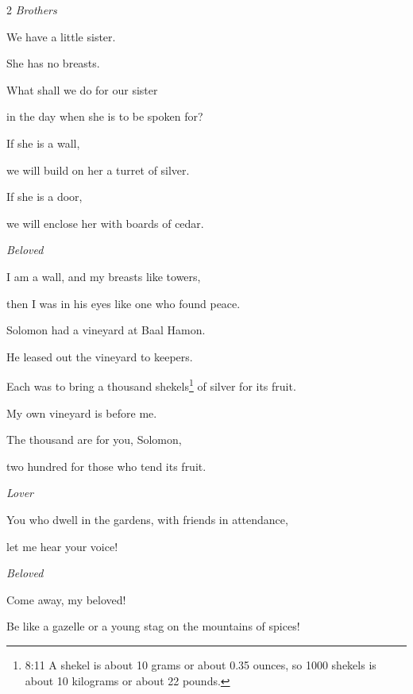 \begin{multicols}{2}
\textit{Brothers}

\myverse{}We have a little sister.

She has no breasts.

What shall we do for our sister

in the day when she is to be spoken for?


\vspace{\baselineskip}

 \myverse{}If she is a wall,

we will build on her a turret of silver.

If she is a door,

we will enclose her with boards of cedar.


\textit{Beloved}

\myverse{}I am a wall, and my breasts like towers,

then I was in his eyes like one who found peace.

\myverse{}Solomon had a vineyard at Baal Hamon.

He leased out the vineyard to keepers.

Each was to bring a thousand shekels\footnote{8:11 A shekel is about 10 grams or about 0.35 ounces, so 1000 shekels is about 10 kilograms or about
	22 pounds.} of silver for its fruit.

\myverse{}My own vineyard is before me.

The thousand are for you, Solomon,

two hundred for those who tend its fruit.


\textit{Lover}

\myverse{}You who dwell in the gardens, with friends in attendance,

let me hear your voice!


\textit{Beloved}

\myverse{}Come away, my beloved!

Be like a gazelle or a young stag on the mountains of spices!
\end{multicols}

